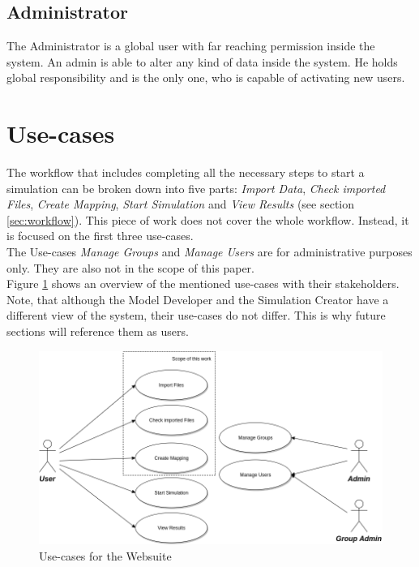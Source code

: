 \subsection{Administrator}
The Administrator is a global user with far reaching permission inside the system. An admin is able to alter any kind of data inside the system. He holds global responsibility and is the only one, who is capable of activating new users.


\section{Use-cases}
The workflow that includes completing all the necessary steps to start a simulation can be broken down into five parts: \textit{Import Data}, \textit{Check imported Files}, \textit{Create Mapping}, \textit{Start Simulation} and \textit{View Results} (see section \ref{sec:workflow}). This piece of work does not cover the whole workflow. Instead, it is focused on the first three use-cases.\\
The Use-cases \textit{Manage Groups} and \textit{Manage Users} are for administrative purposes only. They are also not in the scope of this paper.\\
Figure \ref{fig:use-cases} shows an overview of the mentioned use-cases with their stakeholders. Note, that although the Model Developer and the Simulation Creator have a different view of the system, their use-cases do not differ. This is why future sections will reference them as users.
\begin{figure}[H]
	\centering\includegraphics[width=1\textwidth]{res/Use-Cases_reduced}
	\caption{Use-cases for the Websuite}
	\label{fig:use-cases}
\end{figure}

